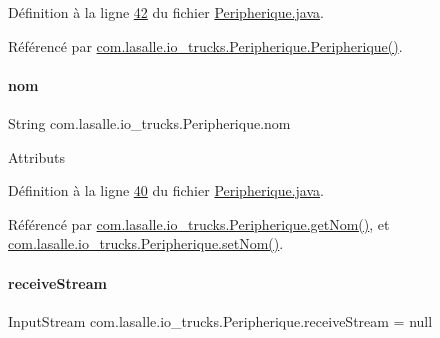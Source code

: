 Définition à la ligne \hyperlink{_peripherique_8java_source_l00042}{42} du fichier \hyperlink{_peripherique_8java_source}{Peripherique.\+java}.



Référencé par \hyperlink{_peripherique_8java_source_l00054}{com.\+lasalle.\+io\+\_\+trucks.\+Peripherique.\+Peripherique()}.

\mbox{\label{classcom_1_1lasalle_1_1io__trucks_1_1_peripherique_a57ad735952307998eddf5277be95ec95}} 
\paragraph{\texorpdfstring{nom}{nom}}
{\footnotesize\ttfamily String com.\+lasalle.\+io\+\_\+trucks.\+Peripherique.\+nom\hspace{0.3cm}{\ttfamily [private]}}

Attributs 

Définition à la ligne \hyperlink{_peripherique_8java_source_l00040}{40} du fichier \hyperlink{_peripherique_8java_source}{Peripherique.\+java}.



Référencé par \hyperlink{_peripherique_8java_source_l00104}{com.\+lasalle.\+io\+\_\+trucks.\+Peripherique.\+get\+Nom()}, et \hyperlink{_peripherique_8java_source_l00131}{com.\+lasalle.\+io\+\_\+trucks.\+Peripherique.\+set\+Nom()}.

\mbox{\label{classcom_1_1lasalle_1_1io__trucks_1_1_peripherique_aa9909de8df9a7873f63d9e2a3e08772d}} 
\paragraph{\texorpdfstring{receive\+Stream}{receiveStream}}
{\footnotesize\ttfamily Input\+Stream com.\+lasalle.\+io\+\_\+trucks.\+Peripherique.\+receive\+Stream = null\hspace{0.3cm}{\ttfamily [private]}}




